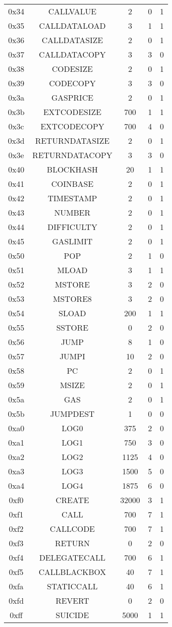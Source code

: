 \documentclass[10pt,a4paper,leqno,bibliography=totoc]{scrartcl}
\newenvironment{alphafootnotes}
{\par\edef\savedfootnotenumber{\number\value{footnote}}
\renewcommand{\thefootnote}{\alph{footnote}}
\setcounter{footnote}{0}}
{\par\setcounter{footnote}{\savedfootnotenumber}}
\begin{document}
\begin{alphafootnotes}
{\begin{longtable}{|ccccc|}
0x34 & CALLVALUE & 2 & 0 & 1 \\
0x35 & CALLDATALOAD & 3 & 1 & 1 \\
0x36 & CALLDATASIZE & 2 & 0 & 1 \\
0x37 & CALLDATACOPY & 3 & 3 & 0 \\
0x38 & CODESIZE & 2 & 0 & 1 \\
0x39 & CODECOPY & 3 & 3 & 0 \\
0x3a & GASPRICE & 2 & 0 & 1 \\
0x3b & EXTCODESIZE & 700 & 1 & 1 \\
0x3c & EXTCODECOPY & 700 & 4 & 0 \\
0x3d & RETURNDATASIZE & 2 & 0 & 1 \\
0x3e & RETURNDATACOPY & 3 & 3 & 0 \\
0x40 & BLOCKHASH & 20 & 1 & 1 \\
0x41 & COINBASE & 2 & 0 & 1 \\
0x42 & TIMESTAMP & 2 & 0 & 1 \\
0x43 & NUMBER & 2  & 0 & 1 \\
0x44 & DIFFICULTY & 2 & 0 & 1 \\
0x45 & GASLIMIT & 2  & 0 & 1 \\
0x50 & POP & 2 & 1 & 0 \\
0x51 & MLOAD & 3 & 1 & 1 \\
0x52 & MSTORE & 3 & 2 & 0 \\
0x53 & MSTORE8 & 3 & 2 & 0 \\
0x54 & SLOAD & 200 & 1 & 1 \\
0x55 & SSTORE & 0 & 2 & 0 \\
0x56 & JUMP & 8 & 1 & 0 \\
0x57 & JUMPI & 10 & 2 & 0 \\
0x58 & PC & 2 & 0 & 1 \\
0x59 & MSIZE & 2 & 0 & 1 \\
0x5a & GAS & 2 & 0 & 1 \\
0x5b & JUMPDEST & 1 & 0 & 0 \\
0xa0 & LOG0 & 375 & 2 & 0 \\
0xa1 & LOG1 & 750 & 3 & 0 \\
0xa2 & LOG2 & 1125 & 4 & 0 \\
0xa3 & LOG3 & 1500 & 5 & 0 \\
0xa4 & LOG4 & 1875 & 6 & 0 \\
0xf0 & CREATE & 32000 & 3 & 1 \\
0xf1 & CALL & 700 & 7 & 1 \\
0xf2 & CALLCODE & 700 & 7 & 1 \\
0xf3 & RETURN & 0 & 2 & 0 \\
0xf4 & DELEGATECALL & 700 & 6 & 1 \\
0xf5 & CALLBLACKBOX & 40 & 7 & 1 \\
0xfa & STATICCALL & 40 & 6 & 1 \\
0xfd & REVERT & 0 & 2 & 0 \\
0xff & SUICIDE & 5000 & 1 & 1 \\
\hline
\end{longtable}
}



\end{alphafootnotes}
\end{document}
